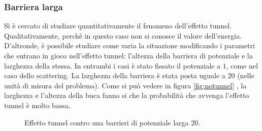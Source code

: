  \subsubsection{Barriera larga}
 Si è cercato di studiare quantitativamente il fenomeno dell'effetto tunnel. Qualitativamente, perchè in questo caso non si conosce il valore dell'energia.
 D'altronde, è possibile studiare come varia la situazione modificando i parametri che entrano in gioco nell'effetto tunnel: l'altezza della barriera di potenziale e la larghezza della stessa.
 In entrambi i casi è stato fissato il potenziale a $1$, come nel caso dello scattering.
 La larghezza della barriera è stata posta uguale a 20 (nelle unità di misura del problema). Come si può vedere in figura
 \ref{fig:notunnel} , la larghezza e l'altezza della buca fanno si che la probabilità che avvenga l'effetto tunnel è molto bassa.
\begin{figure}[!h]
 \centering
 \caption{\small{Effetto tunnel contro una barrieri di potenziale larga 20.}}

\end{figure}
